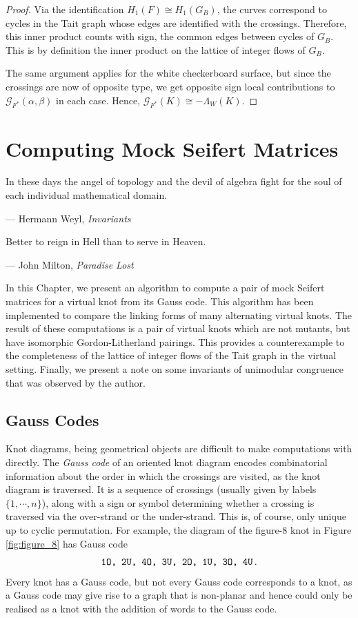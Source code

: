 \documentclass[12pt]{report}
\begin{document}
\begin{proof}
Via the identification $H_{1}(F) \cong H_{1}(G_{B})$, the curves correspond to cycles in the Tait graph whose edges are identified with the crossings. Therefore, this inner product counts with sign, the common edges between cycles of $G_{B}$. This is by definition the inner product on the lattice of integer flows of $G_{B}$.

The same argument applies for the white checkerboard surface, but since the crossings are now of opposite type, we get opposite sign local contributions to $\mathcal{G}_{F^{*}}(\alpha, \beta)$ in each case. Hence, $\mathcal{G}_{F^{*}}(K) \cong -\Lambda_{W}(K)$.


\end{proof}

\chapter{Computing Mock Seifert Matrices}

\epigraph{In these days the angel of topology and the devil of algebra fight for the soul of each individual mathematical domain.}{--- Hermann Weyl, \textit{Invariants}}

\epigraph{Better to reign in Hell than to serve in Heaven.}{--- John Milton, \textit{Paradise Lost}}

In this Chapter, we present an algorithm to compute a pair of mock Seifert matrices for a virtual knot from its Gauss code. This algorithm has been implemented to compare the linking forms of many alternating virtual knots. The result of these computations is a pair of virtual knots which are not mutants, but have isomorphic Gordon-Litherland pairings. This provides a counterexample to the completeness of the lattice of integer flows of the Tait graph in the virtual setting. Finally, we present a note on some invariants of unimodular congruence that was observed by the author.

\section{Gauss Codes}

Knot diagrams, being geometrical objects are difficult to make computations with directly. The \textit{Gauss code} of an oriented knot diagram encodes combinatorial information about the order in which the crossings are visited, as the knot diagram is traversed. It is a sequence of crossings (usually given by labels $\{1, \cdots, n\}$), along with a sign or symbol determining whether a crossing is traversed via the over-strand or the under-strand. This is, of course, only unique up to cyclic permutation. For example, the diagram of the figure-8 knot in Figure \ref{fig:figure_8} has Gauss code
\[\text{\ttfamily 1O,\ 2U,\ 4O,\ 3U,\ 2O,\ 1U,\ 3O,\ 4U}\,.\]
Every knot has a Gauss code, but not every Gauss code corresponds to a knot, as a Gauss code may give rise to a graph that is non-planar and hence could only be realised as a knot with the addition of words to the Gauss code.
\end{document}
